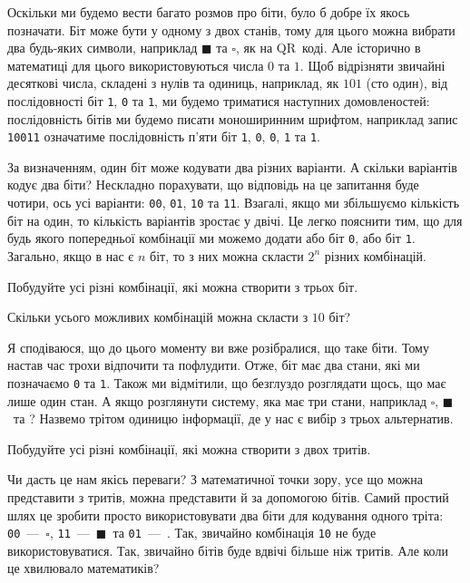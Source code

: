 \documentclass{book}
\newcommand{\bitstr}[1]{{\tt #1}}
\newcommand{\bitdesc}{послідовність бітів ми будемо писати моноширинним шрифтом, наприклад запис \bitstr{10011} означатиме послідовність п'яти біт \bitstr{1}, \bitstr{0}, \bitstr{0}, \bitstr{1} та \bitstr{1}.}
\newcommand{\tritzero}{$\square$}
\newcommand{\trithalf}{\Yinyang}
\newcommand{\tritone}{$\blacksquare$}
\begin{document}
Оскільки ми будемо вести багато розмов про біти, було б добре їх якось позначати.
Біт може бути у одному з двох станів, тому для цього можна вибрати два будь-яких символи, наприклад $\blacksquare$ та $\square$, як на QR~коді.
Але історично в математиці для цього використовуються числа $0$ та $1$.
Щоб відрізняти звичайні десяткові числа, складені з нулів та одиниць, наприклад, як  $101$ (сто один),  від послідовності біт \bitstr{1}, \bitstr{0} та \bitstr{1}, ми будемо триматися наступних домовленостей:
\bitdesc

За визначенням, один біт може кодувати два різних варіанти. А скільки варіантів кодує два біти? Нескладно порахувати, що відповідь на це запитання буде чотири, ось усі варіанти: \bitstr{00}, \bitstr{01}, \bitstr{10} та \bitstr{11}. Взагалі, якщо ми збільшуємо кількість біт на один, то кількість варіантів зростає у двічі.
Це легко пояснити тим, що для будь якого попередньої комбінації ми можемо додати або біт \bitstr{0}, або біт \bitstr{1}.
Загально, якщо в нас є $n$ біт, то з них можна скласти $2^n$ різних комбінацій.

\begin{exercise}
Побудуйте усі різні комбінації, які можна створити з трьох біт.
\end{exercise}

\begin{exercise}
Скільки усього можливих комбінацій можна скласти з $10$ біт?
\end{exercise}

Я сподіваюся, що до цього моменту ви вже розібралися, що таке біти.
Тому настав час трохи відпочити та пофлудити.
Отже, біт має два стани, які ми позначаємо \bitstr{0} та \bitstr{1}.
Також ми відмітили, що безглуздо розглядати щось, що має лише один стан.
А якщо розглянути систему, яка має три стани, наприклад \tritzero, \tritone\ та \trithalf?
 Назвемо трітом одиницю інформації, де у нас є вибір з трьох альтернатив.

\begin{exercise}
Побудуйте усі різні комбінації, які можна створити з двох тритів.
\end{exercise}

Чи дасть це нам якісь переваги?
З математичної точки зору, усе що можна представити з тритів, можна представити й за допомогою бітів.
Самий простий шлях це зробити просто використовувати два біти для кодування одного тріта: \bitstr{00}~—~\tritzero, \bitstr{11}~—~\tritone\ та \bitstr{01}~—~\trithalf.
Так, звичайно комбінація \bitstr{10} не буде використовуватися.
Так, звичайно бітів буде вдвічі більше ніж тритів.
Але коли це хвилювало математиків?
\end{document}
